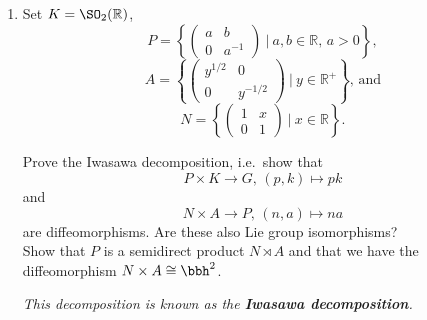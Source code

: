 \documentclass{article}[10pt]
\theoremstyle{definition}
\newtheorem*{solution*}{Solution}
\newcommand{\bbR}{\mathbb{R}}
\begin{document}
\begin{enumerate}
\begin{enumerate}[label=(\alph*),start=2]
{\begin{mdframed}
\begin{solution*}
			To see that the action is transitive note that 
			\begin{equation*}
			\begin{pmatrix}y^{1/2} & xy^{-1/2} \\ 0 & y^{-1/2}\end{pmatrix} \cdot i = x+iy
			\end{equation*}
			for any $x+iy \in \mathbb{H}^2$. Furthermore,
			\begin{equation*}
				\begin{pmatrix}a & b \\ c & d\end{pmatrix}\cdot i = i  \Longleftrightarrow \dfrac{ai+b}{ci+d} = i \Longleftrightarrow ai+b = -c +id
			\end{equation*}
			Taking real and imaginary parts, one deduces that the stabiliser of $i$ is $\operatorname{SO}(2,\bbR)$. That $G/K \to \mathbb{H}^2$ is a diffeomorphism follows from standard arguments in Differential Geometry, see Helgason II.3.2 and II.4.3(a).
			\end{solution*}
			\end{mdframed}
			}
			
			\item Set $K=\SO_{2}(\mathbb{R})$,
			\[
			P= \left \{
			\begin{pmatrix}
			a & b\\
			0 & a^{-1}
			\end{pmatrix}
			~|~a,b\in\mathbb{R}\text{, }a>0 \right \},
			\]
			\[
			A= \left \{
			\begin{pmatrix}
			y^{1/2} & 0\\
			0 & y^{-1/2}%
			\end{pmatrix}
			~|~y\in\mathbb{R}^{+} \right \}\text{, and}%
			\]
			\[
			N = \left \{
			\begin{pmatrix}
			1 & x\\
			0 & 1
			\end{pmatrix}
			~|~x\in\mathbb{R} \right \}\text{.}
			\]
			
			Prove the Iwasawa decomposition, i.e.\ show that
			\[
			P\times K\longrightarrow G\text{, }(p,k)\longmapsto pk
			\]
			and
			\[
			N\times A\longrightarrow P\text{, }(n,a)\longmapsto na
			\]
			are diffeomorphisms. Are these also Lie group isomorphisms?\\ Show that $P$ is a semidirect product $N\rtimes A$ and that we have the diffeomorphism $N\times A\cong\bbh^2$.
			
			\emph{This decomposition is known as the \textbf{Iwasawa decomposition}.}
			

\end{enumerate}
\end{enumerate}
\end{document}
